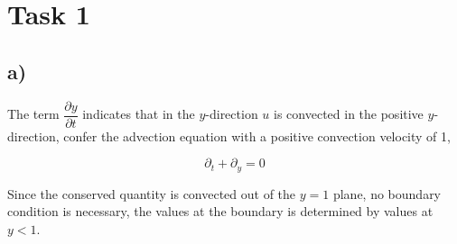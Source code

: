 \documentclass{article}
\begin{document}

\section{Task 1}

\subsection{a)}
The term $\dfrac{\partial y}{\partial t}$ indicates that in the $y$-direction $u$ is convected in the positive $y$-direction, confer the advection equation with a positive convection velocity of 1,

\begin{equation}
\partial_t + \partial_y = 0
\end{equation}

Since the conserved quantity is convected out of the $y=1$ plane, no boundary condition is necessary, the values at the boundary is determined by values at $y<1$.
\end{document}
